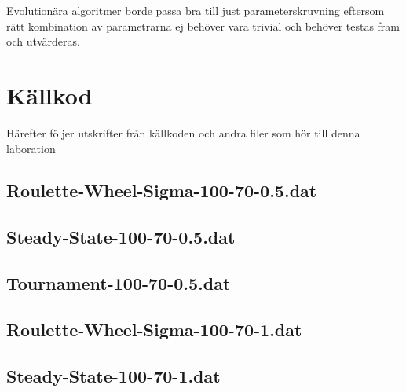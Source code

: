 \documentclass[titlepage, a4paper, 12pt]{article}
\begin{document}
Evolutionära algoritmer borde passa bra till just parameterskruvning
eftersom rätt kombination av parametrarna ej behöver vara trivial och
behöver testas fram och utvärderas.




\newpage
\appendix
{}
\section{Källkod}\label{sec:kallkod}
Härefter följer utskrifter från källkoden och andra filer som hör till
denna laboration

\subsection{Roulette-Wheel-Sigma-100-70-0.5.dat}\label{Roulette-Wheel-Sigma-100-70-0.5.dat}
\begin{footnotesize}
  
\end{footnotesize}

\subsection{Steady-State-100-70-0.5.dat}\label{Steady-State-100-70-0.5.dat}
\begin{footnotesize}
  
\end{footnotesize}

\subsection{Tournament-100-70-0.5.dat}\label{Tournament-100-70-0.5.dat}
\begin{footnotesize}
  
\end{footnotesize}


\subsection{Roulette-Wheel-Sigma-100-70-1.dat}\label{Roulette-Wheel-Sigma-100-70-1.dat}
\begin{footnotesize}
  
\end{footnotesize}

\subsection{Steady-State-100-70-1.dat}\label{Steady-State-100-70-1.dat}
\begin{footnotesize}
  
\end{footnotesize}
\end{document}
